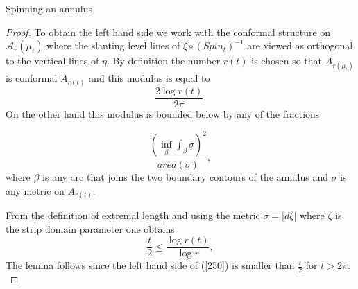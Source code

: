 \documentclass[12pt]{amsart}
\theoremstyle{remark}
\theoremstyle{definition}
\theoremstyle{definition}
\begin{document}
\begin{section}{Spinning an annulus}
\begin{proof}
To obtain the left hand side we work with the conformal structure on ${\mathcal A}_r(\mu_t)$ where 
the slanting level lines of $\xi \circ (Spin_t)^{-1}$ are viewed as orthogonal to the vertical 
lines of $\eta.$ By definition the number $r(t)$ is chosen so that $A_{r(\mu_t)}$ is conformal  
$A_{r(t)}$ and this modulus is equal to 
$$\frac{2\log r(t)}{2 \pi}.$$ 
On the other hand this modulus is bounded below by any of the fractions

$$\frac{(\inf_{\beta} \int_{\beta} \sigma)^2}{area(\sigma)},$$
where $\beta$ is any arc that joins the two boundary contours of the annulus
and $\sigma$ is any metric on $A_{r(t)}.$


From the definition of extremal length and using the metric $\sigma = |d\zeta|$ where $\zeta$ is the strip domain parameter one obtains
$$\frac{t}{2} \leq \frac{\log r(t)}{\log r},$$
The lemma follows since the left hand side of (\ref{250}) is smaller than $\frac{t}{2}$ for $t>2\pi.$
\end{proof} 

\end{section} 
  
  
  
\end{document}
